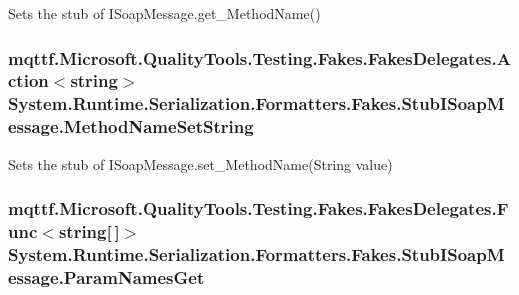Sets the stub of I\-Soap\-Message.\-get\-\_\-\-Method\-Name()

\hypertarget{class_system_1_1_runtime_1_1_serialization_1_1_formatters_1_1_fakes_1_1_stub_i_soap_message_a2d22d935754c4226dc574e3a3477cf4c}{
\subsubsection[{Method\-Name\-Set\-String}]{\setlength{\rightskip}{0pt plus 5cm}mqttf.\-Microsoft.\-Quality\-Tools.\-Testing.\-Fakes.\-Fakes\-Delegates.\-Action$<$string$>$ System.\-Runtime.\-Serialization.\-Formatters.\-Fakes.\-Stub\-I\-Soap\-Message.\-Method\-Name\-Set\-String}}\label{class_system_1_1_runtime_1_1_serialization_1_1_formatters_1_1_fakes_1_1_stub_i_soap_message_a2d22d935754c4226dc574e3a3477cf4c}


Sets the stub of I\-Soap\-Message.\-set\-\_\-\-Method\-Name(\-String value)

\hypertarget{class_system_1_1_runtime_1_1_serialization_1_1_formatters_1_1_fakes_1_1_stub_i_soap_message_aa362f34c2a8d9b076bdbfb6f345428cc}{
\subsubsection[{Param\-Names\-Get}]{\setlength{\rightskip}{0pt plus 5cm}mqttf.\-Microsoft.\-Quality\-Tools.\-Testing.\-Fakes.\-Fakes\-Delegates.\-Func$<$string\mbox{[}$\,$\mbox{]}$>$ System.\-Runtime.\-Serialization.\-Formatters.\-Fakes.\-Stub\-I\-Soap\-Message.\-Param\-Names\-Get}}\label{class_system_1_1_runtime_1_1_serialization_1_1_formatters_1_1_fakes_1_1_stub_i_soap_message_aa362f34c2a8d9b076bdbfb6f345428cc}


